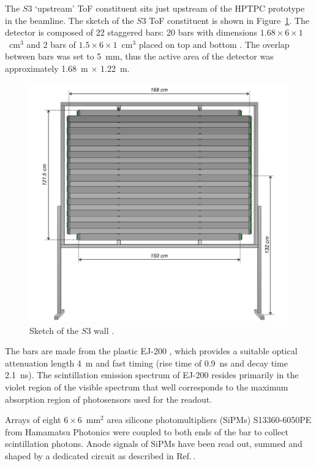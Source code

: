 The $S3$ `upstream' ToF constituent sits just upstream of the HPTPC prototype in the beamline. The sketch of the $S3$ ToF constituent is shown in Figure~\ref{fig:S3sketch}. The detector is composed of 22 staggered bars:  20 bars with dimensions $1.68 \times 6 \times 1$~cm$^3$ and 2 bars of  $1.5 \times 6 \times 1$~cm$^3$ placed on top and bottom \cite{S3-proceedings}.
The overlap between bars was set to 5~mm, thus the active area of the detector was approximately 1.68~m $\times$ 1.22~m.
     \begin{figure}
      \centering
    \includegraphics[width=0.7\linewidth]{files/Figures/uToF_sketch.pdf}
    	\caption{Sketch of the $S3$ wall \cite{S3-proceedings}.}
    		\label{fig:S3sketch}
    \end{figure}
    
The bars are made from the plastic EJ-200 \cite{SCIONIX}, which 
provides a suitable optical attenuation length 4~m and fast timing (rise time of 0.9~ns and decay time 2.1~ns). 
The scintillation emission spectrum of EJ-200 resides primarily in the violet region of the visible spectrum that well corresponds to the maximum absorption region of photosensors used for the readout.

Arrays of eight $6 \times 6$~mm$^2$ area silicone photomultipliers (SiPMs) S13360-6050PE from Hamamatsu Photonics \cite{Hamamatsu} were coupled to both ends of the bar to collect scintillation photons. Anode signals of SiPMs have been read out, summed and shaped by a dedicated circuit as described in Ref.\,\cite{S3-readout}.

